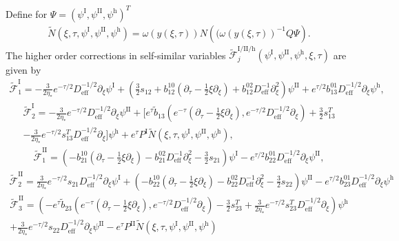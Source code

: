 \documentclass[11pt]{article}
\newcommand{\mcf}{\mathcal{F}}
\numberwithin{equation}{section}
\numberwithin{prop}{section}
\newcommand{\psih}{\psi^\mathrm{h}}
\newcommand{\Deff}{D_\mathrm{eff}}
\newcommand{\tfi}{\tilde{\mathcal{F}}^\mathrm{I}}
\newcommand{\tfii}{\tilde{\mathcal{F}}^\mathrm{II}}
\newcommand{\psiI}{\psi^\mathrm{I}}
\newcommand{\psiII}{\psi^\mathrm{II}}
\newcommand{\PI}{P^\mathrm{I}}
\newcommand{\PII}{P^\mathrm{II}}
\begin{document}
Define for $\Psi = (\psiI, \psiII, \psih)^T$
\begin{align}
\tilde{N}(\xi, \tau, \psiI, \psiII, \psih) = \omega(y(\xi, \tau)) N \left( (\omega(y(\xi, \tau))^{-1} Q \Psi \right).
\end{align}
The higher order corrections in self-similar variables $\tilde{\mcf}^\mathrm{I/II/h}_j (\psiI, \psiII, \psih, \xi, \tau)$ are given by
\begin{multline}
\tfi_1 =  - \frac{3}{2\eta_*} e^{-\tau/2} \Deff^{-1/2} \partial_\xi\psiI + \left( \frac{3}{2} s_{12} + b_{12}^{10} (\partial_\tau - \frac{1}{2} \xi \partial_\xi ) + b_{12}^{02} \Deff^{-1} \partial_\xi^2 \right) \psiII + e^{\tau/2} b_{13}^{01} \Deff^{-1/2} \partial_\xi \psih, \label{e: tfi 1 expression}
\end{multline}
\begin{multline}
\tfi_2 =  - \frac{3}{2 \eta_*} e^{-\tau/2} \Deff^{-1/2} \partial_\xi \psiII  + \bigg[ e^\tau \tilde{b}_{13} \left( e^{-\tau} (\partial_\tau - \frac{1}{2} \xi \partial_\xi), e^{-\tau/2} \Deff^{-1/2} \partial_\xi \right) + \frac{3}{2} s_{13}^T \\ - \frac{3}{2 \eta_*} e^{-\tau/2} s_{13}^T \Deff^{-1/2} \partial_\xi \bigg] \psih  + e^\tau \PI \tilde{N}(\xi, \tau, \psiI, \psiII, \psih), 
\end{multline}
\begin{align}
\tfii_1 = \left( - b_{21}^{10} (\partial_\tau - \frac{1}{2} \xi \partial_\xi ) - b_{21}^{02} \Deff^{-1} \partial_\xi^2 - \frac{3}{2} s_{21}\right) \psiI - e^{\tau/2} b_{22}^{01} \Deff^{-1/2} \partial_\xi \psiII, \label{e: tf ii 1 expression}
\end{align}
\begin{multline}
\tfii_2 = \frac{3}{2 \eta_*} e^{-\tau/2} s_{21} \Deff^{-1/2} \partial_\xi  \psiI + \left( -b_{22}^{10} (\partial_\tau - \frac{1}{2} \xi \partial_\xi) - b_{22}^{02} \Deff^{-1} \partial_\xi^2 - \frac{3}{2} s_{22} \right) \psiII - e^{\tau/2} b_{23}^{01} \Deff^{-1/2} \partial_\xi \psih 
\end{multline}
\begin{multline}
\tfii_3 =  \left( - e^{\tau} \tilde{b}_{23} \left( e^{-\tau} (\partial_\tau - \frac{1}{2} \xi \partial_\xi), e^{-\tau/2} \Deff^{-1/2} \partial_\xi \right) - \frac{3}{2} s_{23}^T + \frac{3}{2 \eta_*} e^{-\tau/2} s_{23}^T \Deff^{-1/2} \partial_\xi \right) \psih \\ + \frac{3}{2 \eta_*} e^{-\tau/2} s_{22} \Deff^{-1/2} \partial_\xi \psiII
 - e^\tau \PII \tilde{N}(\xi, \tau, \psiI, \psiII, \psih) 
\end{multline}
\end{document}
